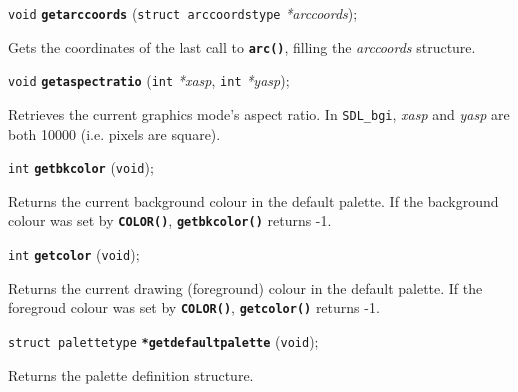 \documentclass[a4paper,12pt]{article}
\newcommand{\SDLbgi}{\texttt{SDL\_bgi}}
\newcommand{\V}{\texttt{void}}      %
\newcommand{\I}{\texttt{int}}       %
\newcommand{\func}[1]{\textbf{\texttt{#1}}}  %
\newcommand{\A}[1]{\emph{#1}}       %
\newenvironment{bgi}
{ %
  \begin{snugshade}
}
{ %
  \end{snugshade}
}
\begin{document}
\label{sec:getarccoords}

\begin{bgi}
\V{} \func{getarccoords} (\texttt{struct arccoordstype} \A{*arccoords});
\end{bgi}

Gets the coordinates of the last call to \func{arc()}, filling the
\A{arccoords} structure.


\label{sec:getaspectratio}

\begin{bgi}
\V{} \func{getaspectratio} (\I{} \A{*xasp}, \I{} \A{*yasp});
\end{bgi}

Retrieves the current graphics mode's aspect ratio. In \SDLbgi,
\A{xasp} and \A{yasp} are both 10000 (i.e. pixels are square).


\label{sec:getbkcolor}

\begin{bgi}
\I{} \func{getbkcolor} (\V{});
\end{bgi}

Returns the current background colour in the default palette. If the
background colour was set by \func{COLOR()}, \func{getbkcolor()} returns
-1.


\label{sec:getcolor}

\begin{bgi}
\I{} \func{getcolor} (\V{});
\end{bgi}

Returns the current drawing (foreground) colour in the default
palette. If the foregroud colour was set by \func{COLOR()},
\func{getcolor()} returns -1.


\label{sec:getdefaultpalette}

\begin{bgi}
\texttt{struct palettetype} \func{*getdefaultpalette} (\V{});
\end{bgi}

Returns the palette definition structure.
\end{document}
